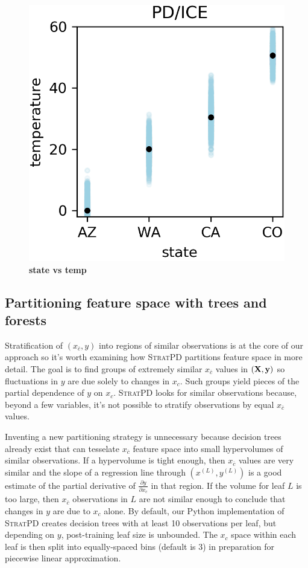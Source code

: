 \documentclass[12pt]{article}
\newcommand{\spd}{\fontfamily{cmr}\textsc{\small StratPD}}
\newcommand{\xnc}{$x_{\overline{c}}$}
\begin{document}
\begin{figure}[htbp]
\begin{center}
\includegraphics[scale=0.7]{images/state_vs_temp_pdp.png}
\caption{{\bf  state  vs temp}}
\label{fig:state_vs_temp}
\end{center}
\end{figure}

\subsection{Partitioning feature space with trees and forests}

Stratification of $(x_{\overline{c}}, y)$ into regions of similar observations is at the core of our approach so it's worth examining how \spd{} partitions feature space in more detail.  The goal is to find groups of extremely similar \xnc{} values in $({\bf X}, {\bf y})$ so fluctuations in $y$ are due solely to changes in $x_c$. Such groups yield pieces of the partial dependence of $y$ on $x_c$. \spd{} looks for similar observations because, beyond a few variables, it's not possible to stratify observations by equal \xnc{} values. 

Inventing a new partitioning strategy is unnecessary because decision trees already exist that can tesselate \xnc{} feature space into small hypervolumes of similar observations. If a hypervolume is tight enough, then \xnc{} values are very similar and the slope of a regression line through $(x^{(L)}, y^{(L)})$ is a good estimate of the partial derivative of $\frac{\partial y}{\partial x_{c}}$ in that region.  If the volume for leaf $L$ is too large, then \xnc{} observations in $L$ are not similar enough to conclude that changes in $y$ are due to $x_c$ alone. By default, our Python implementation of \spd{} creates decision trees with at least 10 observations per leaf, but depending on $y$, post-training leaf size is unbounded. The $x_c$ space within each leaf is then split into equally-spaced bins (default is 3) in preparation for piecewise linear approximation.
\end{document}
